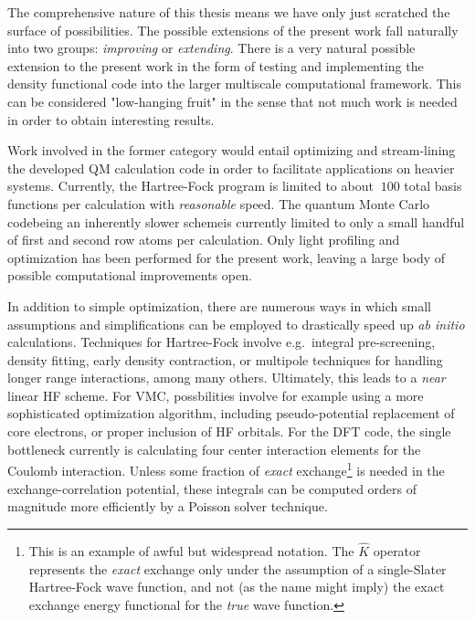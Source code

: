 \documentclass[twoside,english]{uiofysmaster}
\begin{document}
\phantom{-}


The comprehensive nature of this thesis means we have only just scratched the surface of possibilities. The possible extensions of the present work fall naturally into two groups: \emph{improving} or \emph{extending}. There is a very natural possible extension to the present work in the form of testing and implementing the density functional code into the larger multiscale computational framework. This can be considered "low-hanging fruit" in the sense that not much work is needed in order to obtain interesting results. 

Work involved in the former category would entail optimizing and stream-lining the developed QM calculation code in order to facilitate applications on heavier systems. Currently, the Hartree-Fock program is limited to about $~100$ total basis functions per calculation with \emph{reasonable} speed. The quantum Monte Carlo code\textemdash being an inherently slower scheme\textemdash is currently limited to only a small handful of first and second row atoms per calculation. Only light profiling and optimization has been performed for the present work, leaving a large body of possible computational improvements open. 

In addition to simple optimization, there are numerous ways in which small assumptions and simplifications can be employed to drastically speed up \emph{ab initio} calculations. Techniques for Hartree-Fock involve e.g.\ integral pre-screening, density fitting, early density contraction, or multipole techniques for handling longer range interactions, among many others. Ultimately, this leads to a \emph{near} linear HF scheme. For VMC, possbilities involve for example using a more sophisticated optimization algorithm, including pseudo-potential replacement of core electrons, or proper inclusion of HF orbitals. For the DFT code, the single bottleneck currently is calculating four center interaction elements for the Coulomb interaction. Unless some fraction of \emph{exact} exchange\footnote{This is an example of awful but widespread notation. The $\hat K$ operator represents the \emph{exact} exchange only under the assumption of a single-Slater Hartree-Fock wave function, and not (as the name might imply) the exact exchange energy functional for the \emph{true} wave function.} is needed in the exchange-correlation potential, these integrals can be computed orders of magnitude more efficiently by a Poisson solver technique. 
\end{document}
